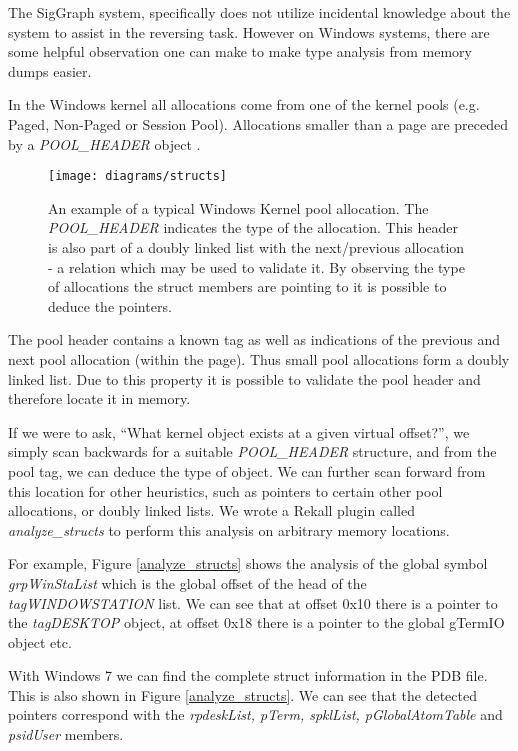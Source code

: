 The SigGraph system, specifically does not utilize incidental knowledge about
the system to assist in the reversing task. However on Windows systems, there
are some helpful observation one can make to make type analysis from memory
dumps easier.

In the Windows kernel all allocations come from one of the kernel pools
(e.g. Paged, Non-Paged or Session Pool). Allocations smaller than a page are
preceded by a {\em POOL\_HEADER} object
\citep{schuster2006pool,schuster2008impact}.

\begin{figure}[tb]
\begin{center}
\texttt{[image: diagrams/structs]}
\caption{An example of a typical Windows Kernel pool allocation. The {\em
    POOL\_HEADER} indicates the type of the allocation. This header is also part
  of a doubly linked list with the next/previous allocation - a relation which
  may be used to validate it. By observing the type of allocations the struct
  members are pointing to it is possible to deduce the pointers.
}
\label{pool_allocations}
\end{center}
\end{figure}


The pool header contains a known tag as well as indications of the previous and
next pool allocation (within the page). Thus small pool allocations form a
doubly linked list. Due to this property it is possible to validate the pool
header and therefore locate it in memory.

If we were to ask, ``What kernel object exists at a given virtual offset?'', we
simply scan backwards for a suitable {\em POOL\_HEADER} structure, and from the
pool tag, we can deduce the type of object. We can further scan forward from
this location for other heuristics, such as pointers to certain other pool
allocations, or doubly linked lists. We wrote a Rekall plugin called {\em
  analyze\_structs} to perform this analysis on arbitrary memory locations.

For example, Figure \ref{analyze_structs} shows the analysis of the global
symbol {\em grpWinStaList} which is the global offset of the head of the {\em
  tagWINDOWSTATION} list.  We can see that at offset 0x10 there is a pointer to
the {\em tagDESKTOP} object, at offset 0x18 there is a pointer to the global
gTermIO object etc.

With Windows 7 we can find the complete struct information in the PDB file.
This is also shown in Figure \ref{analyze_structs}. We can see that the detected
pointers correspond with the {\em rpdeskList, pTerm, spklList, pGlobalAtomTable}
and {\em psidUser} members.


